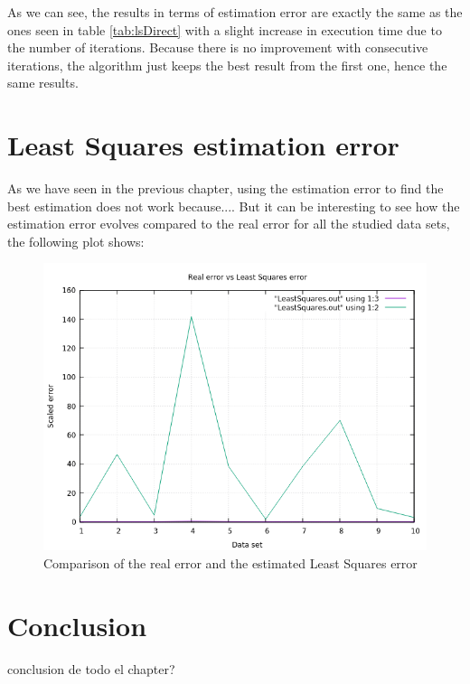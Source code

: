 As we can see, the results in terms of estimation error are exactly the same as the ones seen in table \ref{tab:lsDirect} with a slight increase in execution time due to the number of iterations. Because there is no improvement with consecutive iterations, the algorithm just keeps the best result from the first one, hence the same results.

\section{Least Squares estimation error}

As we have seen in the previous chapter, using the estimation error to find the best estimation does not work because.... But it can be interesting to see how the estimation error evolves compared to the real error for all the studied data sets, the following plot shows:

\begin{figure}[!htb]
	\begin{centering}
		\includegraphics[width=0.5\linewidth]{images/results/comparisonErrors.png}
		\caption{Comparison of the real error and the estimated Least Squares error}
		\label{fig:comparisonErrors}
	\end{centering}
\end{figure}

\section{Conclusion}

conclusion de todo el chapter?

